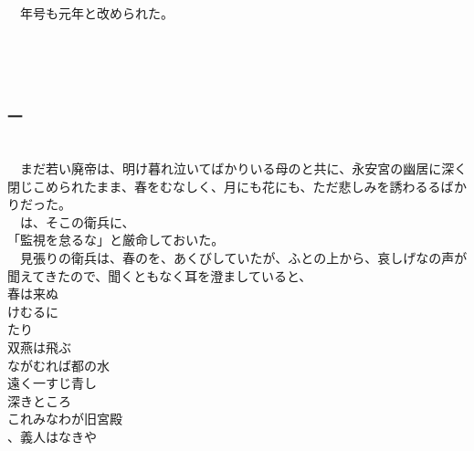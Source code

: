 \documentclass[
  paper=a5,
  fontsize=10pt,
  jafontsize=9.5pt,
  tate,                  %
  open_bracket_pos=nibu, %
]{jlreq}
\begin{document}
　年号も元年と改められた。\\

\\

\subsection{}

\\

\subsubsection{一}

\\


　まだ若い廃帝は、明け暮れ泣いてばかりいる母のと共に、永安宮の幽居に深く閉じこめられたまま、春をむなしく、月にも花にも、ただ悲しみを誘わるるばかりだった。\\


　は、そこの衛兵に、\\


「監視を怠るな」と厳命しておいた。\\


　見張りの衛兵は、春のを、あくびしていたが、ふとの上から、哀しげなの声が聞えてきたので、聞くともなく耳を澄ましていると、\\



春は来ぬ\\


けむるに\\

たり\\


双燕は飛ぶ\\


ながむれば都の水\\


遠く一すじ青し\\

深きところ\\


これみなわが旧宮殿\\

、義人はなきや\\
\end{document}
